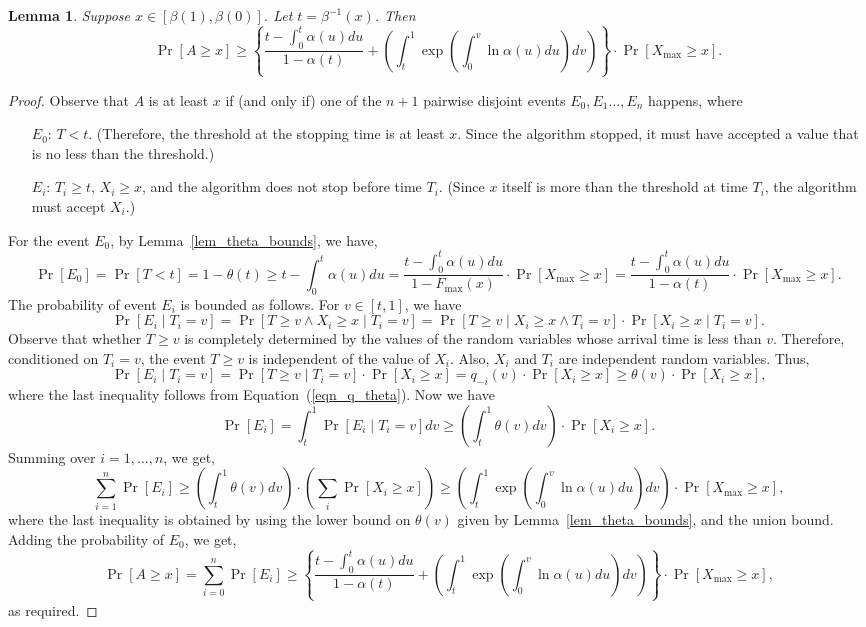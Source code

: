 \documentclass[10pt, letterpaper, twoside]{article}
\newtheorem{lemma}[theorem]{Lemma}
\begin{document}
\begin{lemma}
Suppose $x\in[\beta(1),\beta(0)]$. Let $t=\beta^{-1}(x)$. Then
\[\Pr[A\geq x]\geq\left\{\frac{t-\int_0^t\alpha(u)du}{1-\alpha(t)}+\left(\int_t^1\exp\left(\int_0^v\ln\alpha(u)du\right)dv\right)\right\}\cdot\Pr[X_{\max}\geq x]\text{.}\]
\end{lemma}

\begin{proof}
Observe that $A$ is at least $x$ if (and only if) one of the $n+1$ pairwise disjoint events $E_0,E_1\ldots,E_n$ happens, where
\begin{enumerate}
\item[$E_0$:] $T<t$. (Therefore, the threshold at the stopping time is at least $x$. Since the algorithm stopped, it must have accepted a value that is no less than the threshold.)
\item[$E_i$:] $T_i\geq t$, $X_i\geq x$, and the algorithm does not stop before time $T_i$. (Since $x$ itself is more than the threshold at time $T_i$, the algorithm must accept $X_i$.)
\end{enumerate}
For the event $E_0$, by Lemma~\ref{lem_theta_bounds}, we have,
\[\Pr[E_0]=\Pr[T<t]=1-\theta(t)\geq t-\int_0^t\alpha(u)du=\frac{t-\int_0^t\alpha(u)du}{1-F_{\max}(x)}\cdot\Pr[X_{\max}\geq x]=\frac{t-\int_0^t\alpha(u)du}{1-\alpha(t)}\cdot\Pr[X_{\max}\geq x]\text{.}\]
The probability of event $E_i$ is bounded as follows. For $v\in[t,1]$, we have
\[\Pr[E_i\mid T_i=v]=\Pr[T\geq v\wedge X_i\geq x\mid T_i=v]=\Pr[T\geq v\mid X_i\geq x\wedge T_i=v]\cdot\Pr[X_i\geq x\mid T_i=v]\text{.}\]
Observe that whether $T\geq v$ is completely determined by the values of the random variables whose arrival time is less than $v$. Therefore, conditioned on $T_i=v$, the event $T\geq v$ is independent of the value of $X_i$. Also, $X_i$ and $T_i$ are independent random variables. Thus,
\[\Pr[E_i\mid T_i=v]=\Pr[T\geq v\mid T_i=v]\cdot\Pr[X_i\geq x]=q_{-i}(v)\cdot\Pr[X_i\geq x]\geq\theta(v)\cdot\Pr[X_i\geq x]\text{,}\]
where the last inequality follows from Equation~(\ref{eqn_q_theta}). Now we have
\[\Pr[E_i]=\int_t^1\Pr[E_i\mid T_i=v]dv\geq\left(\int_t^1\theta(v)dv\right)\cdot\Pr[X_i\geq x]\text{.}\]
Summing over $i=1,\ldots,n$, we get,
\[\sum_{i=1}^n\Pr[E_i]\geq\left(\int_t^1\theta(v)dv\right)\cdot\left(\sum_i\Pr[X_i\geq x]\right)\geq\left(\int_t^1\exp\left(\int_0^v\ln\alpha(u)du\right)dv\right)\cdot\Pr[X_{\max}\geq x]\text{,}\]
where the last inequality is obtained by using the lower bound on $\theta(v)$ given by Lemma~\ref{lem_theta_bounds}, and the union bound. Adding the probability of $E_0$, we get,
\[\Pr[A\geq x]=\sum_{i=0}^n\Pr[E_i]\geq\left\{\frac{t-\int_0^t\alpha(u)du}{1-\alpha(t)}+\left(\int_t^1\exp\left(\int_0^v\ln\alpha(u)du\right)dv\right)\right\}\cdot\Pr[X_{\max}\geq x]\text{,}\]
as required.
\end{proof}
\end{document}
